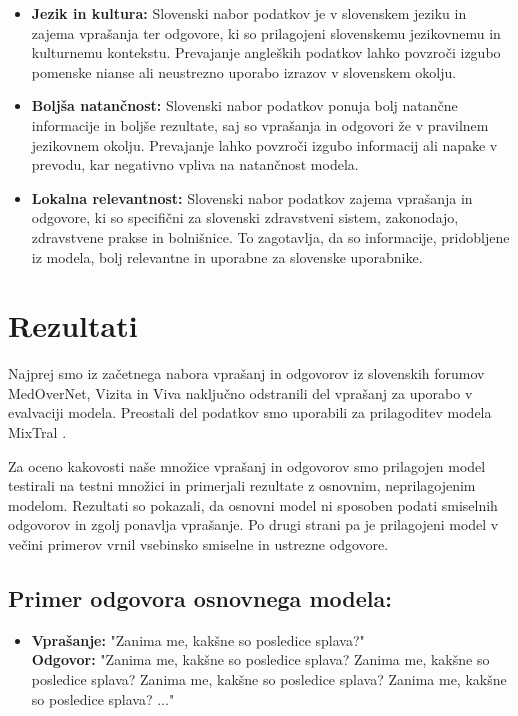 \documentclass[fleqn,moreauthors,10pt]{ds_report}
\begin{document}
\begin{itemize}
    \item \textbf{Jezik in kultura:} Slovenski nabor podatkov je v slo\-ven\-skem jeziku in zajema vprašanja ter odgovore, ki so prilagojeni slovenskemu jezikovnemu in kulturnemu kontekstu. Prevajanje angleških podatkov lahko povzroči izgubo pomenske nianse ali neustrezno uporabo izrazov v slovenskem okolju.
    \item \textbf{Boljša natančnost:} Slovenski nabor podatkov ponuja bolj natančne informacije in boljše rezultate, saj so vprašanja in odgovori že v pravilnem jezikovnem o\-ko\-lju. Prevajanje lahko povzroči izgubo informacij ali napake v prevodu, kar negativno vpliva na natančnost modela.
    \item \textbf{Lokalna relevantnost:} Slovenski nabor podatkov zajema vprašanja in odgovore, ki so specifični za slovenski zdravstveni sistem, zakonodajo, zdravstvene prakse in bolnišnice. To zagotavlja, da so informacije, pridobljene iz modela, bolj relevantne in uporabne za slovenske uporabnike.
\end{itemize}



\section*{Rezultati}

Najprej smo iz začetnega nabora vprašanj in odgovorov iz slovenskih forumov MedOverNet, Vizita in Viva naključno odstranili del vprašanj za uporabo v evalvaciji modela. Preostali del podatkov smo uporabili za prilagoditev modela MixTral \cite{jiang2024mixtral}.

Za oceno kakovosti naše množice vprašanj in odgovorov smo prilagojen model testirali na testni množici in primerjali rezultate z osnovnim, neprilagojenim modelom. Rezultati so pokazali, da osnovni model ni sposoben podati smiselnih odgovorov in zgolj ponavlja vprašanje. Po drugi strani pa je prilagojeni model v večini primerov vrnil vsebinsko smiselne in ustrezne odgovore.

\subsection*{Primer odgovora osnovnega modela:}
\begin{itemize}
    \item   
        \textbf{Vprašanje:} "Zanima me, kakšne so posledice splava?" \\
        \textbf{Odgovor:} "Zanima me, kakšne so posledice splava? Zanima me, kakšne so posledice splava? Zanima me, kakšne so posledice splava? Zanima me, kakšne so posledice splava? ..."
\end{itemize}
\end{document}
